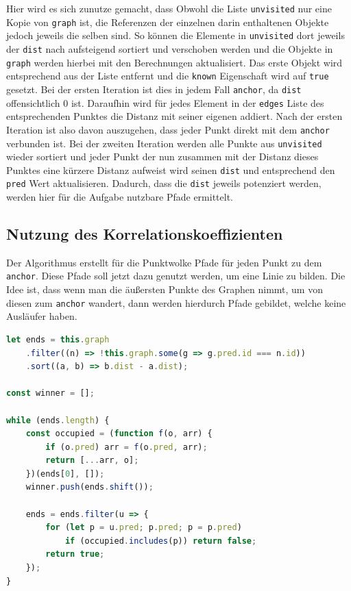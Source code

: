 Hier wird es sich zunutze gemacht, dass Obwohl die Liste \lstinline{unvisited} nur eine Kopie von \lstinline{graph} ist, die Referenzen der einzelnen darin enthaltenen Objekte jedoch jeweils die selben sind.
So können die Elemente in \lstinline{unvisited} dort jeweils der \lstinline{dist} nach aufsteigend sortiert und verschoben werden und die Objekte in \lstinline{graph} werden hierbei mit den Berechnungen aktualisiert.
Das erste Objekt wird entsprechend aus der Liste entfernt und die \lstinline{known} Eigenschaft wird auf \lstinline{true} gesetzt.
Bei der ersten Iteration ist dies in jedem Fall \lstinline{anchor}, da \lstinline{dist} offensichtlich $0$ ist.
Daraufhin wird für jedes Element in der \lstinline{edges} Liste des entsprechenden Punktes die Distanz mit seiner eigenen addiert.
Nach der ersten Iteration ist also davon auszugehen, dass jeder Punkt direkt mit dem \lstinline{anchor} verbunden ist.
Bei der zweiten Iteration werden alle Punkte aus \lstinline{unvisited} wieder sortiert und jeder Punkt der nun zusammen mit der Distanz dieses Punktes eine kürzere Distanz aufweist wird seinen \lstinline{dist} und entsprechend den \lstinline{pred} Wert aktualisieren.
Dadurch, dass die \lstinline{dist} jeweils potenziert werden, werden hier für die Aufgabe nutzbare Pfade ermittelt.

\subsection{Nutzung des Korrelationskoeffizienten}

Der  Algorithmus erstellt für die Punktwolke Pfade für jeden Punkt zu dem \lstinline{anchor}.
Diese Pfade soll jetzt dazu genutzt werden, um eine Linie zu bilden.
Die Idee ist, dass wenn man die äu{\ss}ersten Punkte des Graphen nimmt, um von diesen zum \lstinline{anchor} wandert, dann werden hierdurch Pfade gebildet, welche keine Ausläufer haben.

\begin{lstlisting}[language=JavaScript, caption={Bestimmung der äu{\ss}ersten Knoten zur Bestimmung von Geraden durch den Korrelationskoeffizienten in der \lstinline{groupsByCorrelation} Funktion innerhalb der \lstinline{Dijkstra} Klasse.}, label={lst:dijkstra_correlation_part1}]
let ends = this.graph
    .filter((n) => !this.graph.some(g => g.pred.id === n.id))
    .sort((a, b) => b.dist - a.dist);

const winner = [];

while (ends.length) {
    const occupied = (function f(o, arr) {
        if (o.pred) arr = f(o.pred, arr);
        return [...arr, o];
    })(ends[0], []);
    winner.push(ends.shift());

    ends = ends.filter(u => {
        for (let p = u.pred; p.pred; p = p.pred)
            if (occupied.includes(p)) return false;
        return true;
    });
}
\end{lstlisting}

